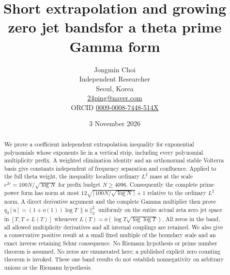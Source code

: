 \documentclass[11pt]{article}
\title{Short extrapolation and growing zero jet bands\newline for a theta prime Gamma form}
\author{Jongmin Choi\\Independent Researcher\\Seoul, Korea\\
\href{mailto:24ping@naver.com}{24ping@naver.com}\\
ORCID \href{https://orcid.org/0009-0008-7448-514X}{0009-0008-7448-514X}}
\date{3 November 2026}
\theoremstyle{remark}
\newcommand{\norm}[1]{\lVert #1\rVert}
\begin{document}
\maketitle
\begin{abstract}
We prove a coefficient independent extrapolation inequality for exponential
polynomials whose exponents lie in a vertical strip, including every
polynomial multiplicity prefix. A weighted elimination identity and an
orthonormal stable Volterra basis give constants independent of frequency
separation and confluence. Applied to the full theta weight, the inequality
localizes ordinary $L^2$ mass at the scale
$e^{2r}=100N/\sqrt{\log N}$ for prefix budget $N\ge4096$.
Consequently the complete prime power form has norm at most
$12\sqrt{\lceil100N/\sqrt{\log N}\rceil}+1$
relative to the ordinary $L^2$ norm.
A direct derivative argument and the complete Gamma multiplier then prove
$q_0[u]=(1+o(1))\log T\,\norm u_2^2$ uniformly on the entire actual zeta
zero jet space in $[T,T+L(T)]$ whenever
$L(T)=o(\log T\sqrt{\log\log T})$.
All zeros in the band, all allowed multiplicity derivatives and all internal
couplings are retained. We also give a conservative positive result at a
small fixed multiple of the boundary scale and an exact inverse retaining
Schur consequence. No Riemann hypothesis or prime number theorem is
assumed. No zeros are enumerated here; a published explicit zero counting
theorem is invoked. These one band results do not establish
nonnegativity on arbitrary unions or the Riemann hypothesis.
\end{abstract}
\end{document}
